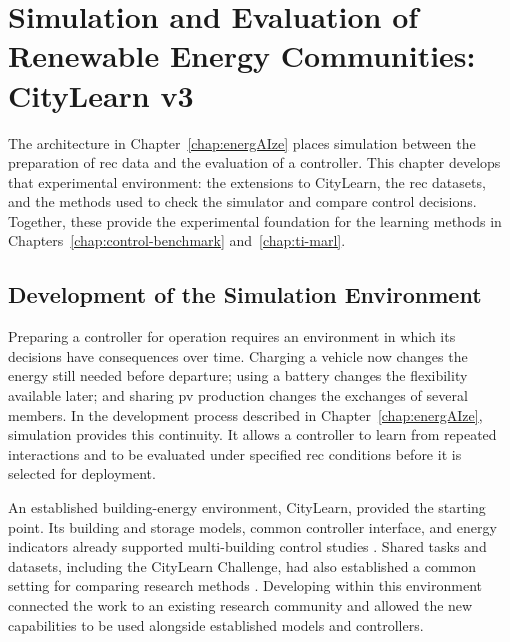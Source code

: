 \chapter{Simulation and Evaluation of Renewable Energy Communities: CityLearn v3}
\label{chap:simulator}

\begingroup
\raggedbottom
{}

The architecture in Chapter~\ref{chap:energAIze} places simulation between the preparation of \gls{rec} data and the evaluation of a controller. This chapter develops that experimental environment: the extensions to CityLearn, the \gls{rec} datasets, and the methods used to check the simulator and compare control decisions. Together, these provide the experimental foundation for the learning methods in Chapters~\ref{chap:control-benchmark} and~\ref{chap:ti-marl}.

\section{Development of the Simulation Environment}
\label{sec:sim-research-contribution}
\label{sec:sim-motivation}
\label{sec:sim-inherited-gap}
\label{sec:sim-lineage}
\label{sec:sim-sota}
\label{sec:sim-iterative-instrument}

Preparing a controller for operation requires an environment in which its decisions have consequences over time. Charging a vehicle now changes the energy still needed before departure; using a battery changes the flexibility available later; and sharing \gls{pv} production changes the exchanges of several members. In the development process described in Chapter~\ref{chap:energAIze}, simulation provides this continuity. It allows a controller to learn from repeated interactions and to be evaluated under specified \gls{rec} conditions before it is selected for deployment.

An established building-energy environment, CityLearn, provided the starting point. Its building and storage models, common controller interface, and energy indicators already supported multi-building control studies \parencite{vazquezcanteli2019citylearn,nweye2025citylearnv2}. Shared tasks and datasets, including the CityLearn Challenge, had also established a common setting for comparing research methods \parencite{nagy2021citylearnchallenge}. Developing within this environment connected the work to an existing research community and allowed the new capabilities to be used alongside established models and controllers.

